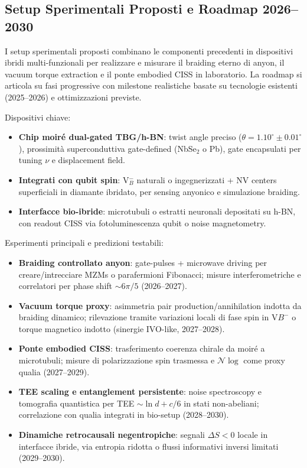 \documentclass[11pt,a4paper]{article}
\theoremstyle{plain}
\theoremstyle{definition}
\begin{document}
\vspace{0.3cm}





\subsection{Setup Sperimentali Proposti e Roadmap 2026–2030}

I setup sperimentali proposti combinano le componenti precedenti in dispositivi ibridi multi-funzionali per realizzare e misurare il braiding eterno di anyon, il vacuum torque extraction e il ponte embodied CISS in laboratorio. La roadmap si articola su fasi progressive con milestone realistiche basate su tecnologie esistenti (2025–2026) e ottimizzazioni previste.

Dispositivi chiave:
\begin{itemize}
    \item \textbf{Chip moiré dual-gated TBG/h-BN}: twist angle preciso ($\theta = 1.10^\circ \pm 0.01^\circ$), prossimità superconduttiva gate-defined (NbSe$_2$ o Pb), gate encapsulati per tuning $\nu$ e displacement field.
    \item \textbf{Integrati con qubit spin}: V$_B^-$ naturali o ingegnerizzati + NV centers superficiali in diamante ibridato, per sensing anyonico e simulazione braiding.
    \item \textbf{Interfacce bio-ibride}: microtubuli o estratti neuronali depositati su h-BN, con readout CISS via fotoluminescenza qubit o noise magnetometry.
\end{itemize}

Esperimenti principali e predizioni testabili:
\begin{itemize}
    \item \textbf{Braiding controllato anyon}: gate-pulses + microwave driving per creare/intrecciare MZMs o parafermioni Fibonacci; misure interferometriche e correlatori per phase shift $\sim 6\pi/5$ (2026–2027).
    \item \textbf{Vacuum torque proxy}: asimmetria pair production/annihilation indotta da braiding dinamico; rilevazione tramite variazioni locali di fase spin in V$B^-$ o torque magnetico indotto (sinergie IVO-like, 2027–2028).
    \item \textbf{Ponte embodied CISS}: trasferimento coerenza chirale da moiré a microtubuli; misure di polarizzazione spin trasmessa e $\mathcal{N}{\log}$ come proxy qualia (2027–2029).
    \item \textbf{TEE scaling e entanglement persistente}: noise spectroscopy e tomografia quantistica per TEE $\sim \ln d + c/6$ in stati non-abeliani; correlazione con qualia integrati in bio-setup (2028–2030).
    \item \textbf{Dinamiche retrocausali negentropiche}: segnali $\Delta S < 0$ locale in interfacce ibride, via entropia ridotta o flussi informativi inversi limitati (2029–2030).
\end{itemize}
\end{document}
